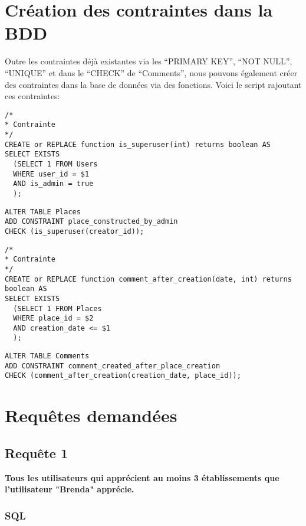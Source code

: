\documentclass[a4paper,10pt]{article}
\begin{document}
\section{Création des contraintes dans la BDD}

Outre les contraintes déjà existantes via les ``PRIMARY KEY'', ``NOT NULL'', ``UNIQUE'' et dans le ``CHECK'' de ``Comments'', nous pouvons également créer des contraintes dans la base de données via des fonctions. Voici le script rajoutant ces contraintes:

\begin{verbatim}
/* 
* Contrainte
*/
CREATE or REPLACE function is_superuser(int) returns boolean AS
SELECT EXISTS
  (SELECT 1 FROM Users
  WHERE user_id = $1
  AND is_admin = true
  );
\end{verbatim}

\begin{verbatim}
ALTER TABLE Places
ADD CONSTRAINT place_constructed_by_admin
CHECK (is_superuser(creator_id));
\end{verbatim}

\newpage

\begin{verbatim}
/*
* Contrainte
*/
CREATE or REPLACE function comment_after_creation(date, int) returns boolean AS
SELECT EXISTS
  (SELECT 1 FROM Places
  WHERE place_id = $2
  AND creation_date <= $1
  );
\end{verbatim}

\begin{verbatim}
ALTER TABLE Comments
ADD CONSTRAINT comment_created_after_place_creation
CHECK (comment_after_creation(creation_date, place_id));
\end{verbatim}

\section{Requêtes demandées}

\subsection{Requête 1}

\textbf{Tous les utilisateurs qui apprécient au moins 3 établissements que l’utilisateur "Brenda" apprécie.}

\subsubsection{SQL}
\end{document}
